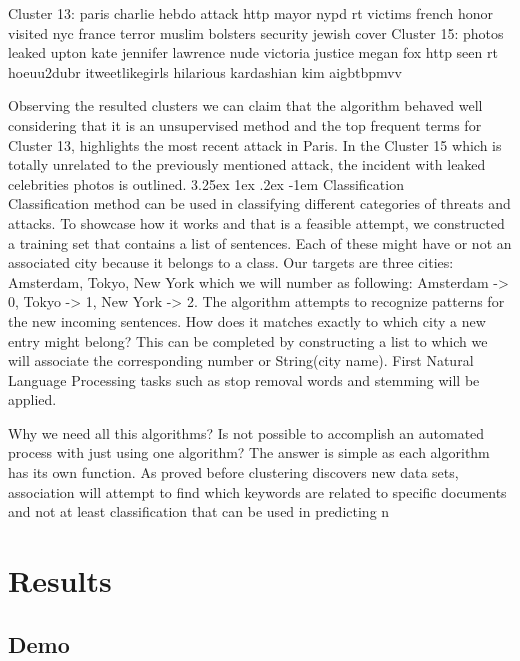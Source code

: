 \documentclass[12pt]{article}
\makeatletter
\renewcommand\paragraph{\@startsection{paragraph}{5}{\z@}%
  {3.25ex \@plus1ex \@minus.2ex}%
  {-1em}%
  {\normalfont\normalsize\bfseries}}
\makeatother
\begin{document}
\begin{spverbatim}
Cluster 13:  paris  charlie  hebdo  attack  http  mayor  nypd  
rt  victims  french  honor  visited  nyc  france  terror  muslim 
 bolsters  security  jewish  cover
Cluster 15:  photos  leaked  upton  kate  jennifer  lawrence 
 nude  victoria  justice  megan  fox  http  seen  rt  hoeuu2dubr  
itweetlikegirls  hilarious  kardashian  kim  aigbtbpmvv
\end{spverbatim}
\hfill \break
Observing the resulted clusters we can claim that the algorithm behaved well considering that it is an unsupervised method and the top frequent terms for Cluster 13, highlights the most recent attack in Paris. In the Cluster 15 which is totally unrelated to the previously mentioned attack, the incident with leaked celebrities photos is outlined. 
\paragraph{Classification}
\hfill \break
\\
Classification method can be used in classifying different categories of threats and attacks. To showcase how it works and that is a feasible attempt, we constructed a training set that contains a list of sentences. Each of these might have or not an associated city because it belongs to a class. Our targets are three cities: Amsterdam, Tokyo, New York which we will number as following: Amsterdam -> 0, Tokyo -> 1, New York -> 2. The algorithm attempts to recognize patterns for the new incoming sentences. How does it matches exactly to which city a new entry might belong? This can be completed by constructing a list to which we will associate the corresponding number or String(city name). First Natural Language Processing tasks such as stop removal words and stemming will be applied.    

Why we need all this algorithms? Is not possible to accomplish an automated process with just using one algorithm? The answer is simple as each algorithm has its own function. As proved before clustering discovers new data sets, association will attempt to find which keywords are related to specific documents and not at least classification that can be used in predicting n

\section{Results}
\subsection{Demo}
\newpage
\end{document}
